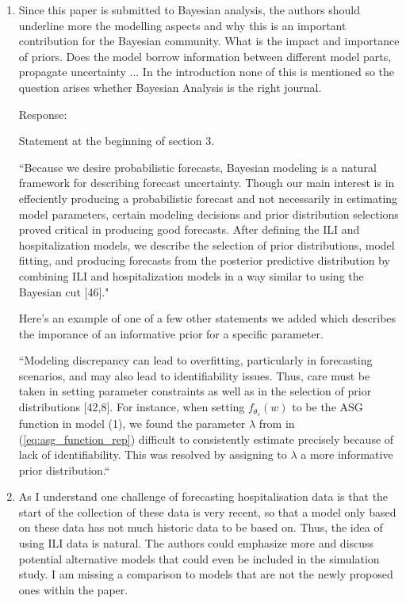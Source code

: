 \documentclass{article}
\newcommand{\spencer}[1]{{\color{red} Response: #1}}
\begin{document}
\begin{enumerate}[1.]

\item Since this paper is submitted to Bayesian analysis, the authors should 
underline more the modelling aspects and why this is an important contribution 
for the Bayesian community. What is the impact and importance of priors. Does 
the model borrow information between different model parts, propagate 
uncertainty ... In the introduction none of this is mentioned so the question 
arises whether Bayesian Analysis is the right journal.

\spencer{

Statement at the beginning of section 3.

``Because we desire probabilistic forecasts, Bayesian modeling is a 
natural framework for describing forecast uncertainty. 
Though our main interest is in effeciently producing a probabilistic 
forecast and not 
necessarily in estimating model parameters, certain modeling decisions and 
prior distribution selections proved critical in producing good 
forecasts. After defining the ILI and hospitalization models, 
we describe the 
selection of prior distributions, model fitting, and producing forecasts
from the posterior predictive distribution by combining ILI and hospitalization
models in a way similar to using the 
Bayesian cut [46]."


Here's an example of one of a 
few other statements we added which describes the imporance of 
an informative prior for a 
specific parameter.

``Modeling discrepancy can lead to 
overfitting, particularly in forecasting scenarios, and may also lead to 
identifiability issues. 
Thus, care must be taken in setting parameter constraints as well as in the 
selection of prior distributions [42,8]. 
For instance, when setting $f_{\theta_s}(w)$ to
be the ASG function
in model (1), we found the parameter $\lambda$ from 
in (\ref{eq:asg_function_rep}) difficult to consistently 
estimate precisely because of lack of identifiability. This was resolved by 
assigning to $\lambda$ a more informative prior distribution.``}

\item As I understand one challenge of forecasting hospitalisation data is that the 
start of the collection of these data is very recent, so that a model only 
based on these data has not much historic data to be based on. Thus, the idea 
of using ILI data is natural. The authors could emphasize more and discuss 
potential alternative models that could even be included in the simulation 
study. I am missing a comparison to models that are not the newly proposed 
ones within the paper.



\end{enumerate}
\end{document}
